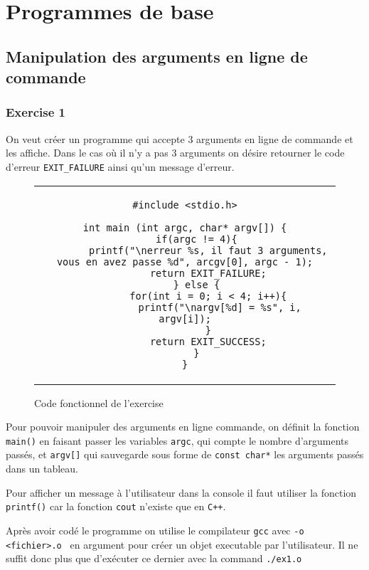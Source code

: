 \documentclass[11pt, openright]{book}
\begin{document}




\newpage

\section{Programmes de base}

\subsection{Manipulation des arguments en ligne de commande}

\subsubsection{Exercise 1}

On veut créer un programme qui accepte $3$ arguments en ligne de commande et les affiche. Dans le cas où il n'y a pas $3$ arguments on désire retourner le code d'erreur \texttt{EXIT\_FAILURE} ainsi qu'un message d'erreur.
\begin{figure}[ht!]
	\centering
	\begin{tabular}{c}
		\begin{lstlisting}
#include <stdio.h>

int main (int argc, char* argv[]) {
	if(argc != 4){
		printf("\nerreur %s, il faut 3 arguments, vous en avez passe %d", arcgv[0], argc - 1);
		return EXIT_FAILURE;
	} else {
		for(int i = 0; i < 4; i++){
			printf("\nargv[%d] = %s", i, argv[i]);
		}
		return EXIT_SUCCESS;
	}
}
					\end{lstlisting}
	\end{tabular}
	\caption{Code fonctionnel de l'exercise }
\end{figure}
Pour pouvoir manipuler des arguments en ligne commande, on définit la fonction \texttt{main()} en faisant passer les variables \texttt{argc}, qui compte le nombre d'arguments passés, et \texttt{argv[]} qui sauvegarde sous forme de \texttt{const char*} les arguments passés dans un tableau.

Pour afficher un message à l'utilisateur dans la console il faut utiliser la fonction \texttt{printf()} car la fonction \texttt{cout} n'existe que en \texttt{C++}.

Après avoir codé le programme on utilise le compilateur \texttt{gcc} avec \texttt{-o <fichier>.o } en argument pour créer un objet executable par l'utilisateur. Il ne suffit donc plus que d'exécuter ce dernier avec la command \texttt{./ex1.o}
\end{document}
